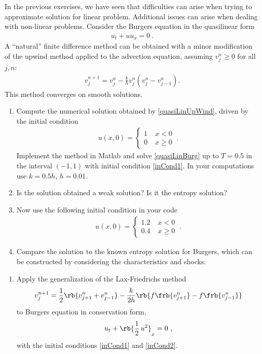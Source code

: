 \documentclass{article}
\begin{document}
\begin{exerciseList}
\item
In the previous exercises, we have seen that difficulties can arise when trying to approximate solution for linear problem. Additional issues can arise when dealing with non-linear problems. Consider the Burgers equation in the quasilinear form
\begin{gather} \label{quasiLinBurg}
	u_{t}+uu_{x}=0\ .
\end{gather}
A ``natural'' finite difference method can be obtained with a minor modification of the upwind method applied to the advection equation, assuming $v_{j}^{n}\geq0$ for all $j,n$:
\begin{gather} \label{quasiLinUpWind}
	v_{j}^{n+1}=v_{j}^{n}-\frac{k}{h}v_{j}^{n}\left(v_{j}^{n} -v_{j-1}^{n}\right).
\end{gather}
This method converges on smooth solutions.
\begin{enumerate}
\item
Compute the numerical solution obtained by \eqref{quasiLinUpWind}, driven by the initial condition
\begin{gather} \label{inCond1}
	u(x,0)=\begin{cases}
			1\; & x<0\\
			0\; & x\geq0
		\end{cases}\ .
\end{gather}
Implement the method in Matlab and solve \eqref{quasiLinBurg} up to $T=0.5$ in the interval $(-1,1)$ with initial condition \eqref{inCond1}. In your computations use $k=0.5h$, $h=0.01$.


\item
Is the solution obtained a weak solution? Is it the entropy
solution?

\item
Now use the following initial condition in your code 
\begin{gather} \label{inCond2}
	u\left(x,0\right)=\begin{cases}
			1.2\; & x<0\\
			0.4\; & x\geq0
		\end{cases}\ .
\end{gather}

\item
Compare the solution to the known entropy solution for Burgers, which can be constructed by considering the characteristics and shocks.
\end{enumerate}


\item
\begin{enumerate}
\item
Apply the generalization of the Lax-Friedrichs method
\begin{gather}
	v_{j}^{n+1}=\frac{1}{2}\rb{v_{j+1}^{n}+v_{j-1}^{n}}
		-\frac{k}{2h}\rb{f\frb{v_{j+1}^{n}}-f\frb{v_{j-1}^{n}}}
\end{gather}
to Burgers equation in conservation form,
\begin{gather}
	u_t+\rb{\frac{1}{2}\, u^2}_x=0\ ,
\end{gather}
with the initial conditions \eqref{inCond1} and \eqref{inCond2}.


\end{enumerate}
\end{exerciseList}
\end{document}

